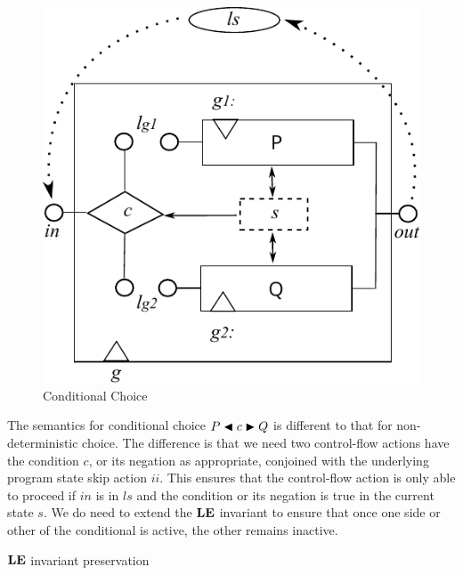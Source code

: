 \begin{figure}[h]
  \centering
  \includegraphics{images/conditional-actual}
  \caption{Conditional Choice}
  \label{fig:conditional}
\end{figure}


The semantics for conditional choice $P \mathrel{\blacktriangleleft{c}\blacktriangleright} Q$
is different to that for non-deterministic choice.
The difference is that we need two control-flow actions
have the condition $c$, or its negation as appropriate,
conjoined with the underlying program state skip action $ii$.
This ensures that the control-flow action is only able to proceed
if $in$ is in $ls$ and the condition or its negation is true
in the current state $s$.
We do need to extend the $\mathbf{LE}$ invariant to ensure
that once one side or other of the conditional is active,
the other remains inactive.


$\mathbf{LE}$ invariant preservation

